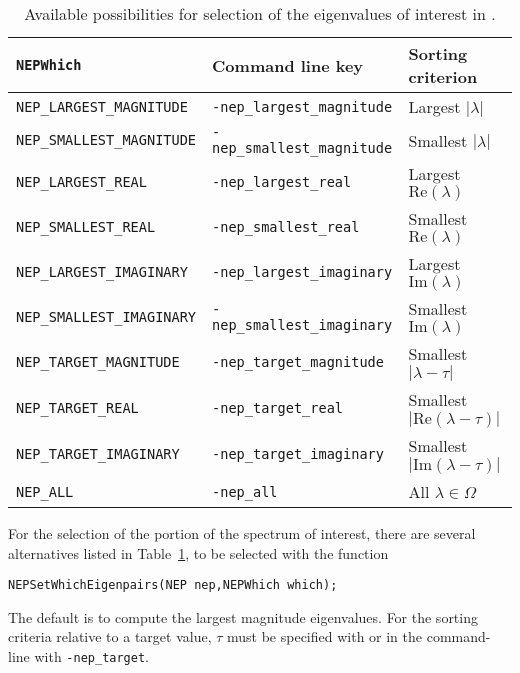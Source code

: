\begin{table}
\centering
{\small \begin{tabular}{lll}
\texttt{NEPWhich}                  & Command line key                   & Sorting criterion \\\hline
\texttt{NEP\_LARGEST\_MAGNITUDE}   & \texttt{-nep\_largest\_magnitude}  & Largest $|\lambda|$ \\
\texttt{NEP\_SMALLEST\_MAGNITUDE}  & \texttt{-nep\_smallest\_magnitude} & Smallest $|\lambda|$ \\
\texttt{NEP\_LARGEST\_REAL}        & \texttt{-nep\_largest\_real}       & Largest $\mathrm{Re}(\lambda)$ \\
\texttt{NEP\_SMALLEST\_REAL}       & \texttt{-nep\_smallest\_real}      & Smallest $\mathrm{Re}(\lambda)$ \\
\texttt{NEP\_LARGEST\_IMAGINARY}   & \texttt{-nep\_largest\_imaginary}  & Largest $\mathrm{Im}(\lambda)$ \\
\texttt{NEP\_SMALLEST\_IMAGINARY}  & \texttt{-nep\_smallest\_imaginary} & Smallest $\mathrm{Im}(\lambda)$ \\\hline
\texttt{NEP\_TARGET\_MAGNITUDE}    & \texttt{-nep\_target\_magnitude}   & Smallest $|\lambda-\tau|$ \\
\texttt{NEP\_TARGET\_REAL}         & \texttt{-nep\_target\_real}        & Smallest $|\mathrm{Re}(\lambda-\tau)|$ \\
\texttt{NEP\_TARGET\_IMAGINARY}    & \texttt{-nep\_target\_imaginary}   & Smallest $|\mathrm{Im}(\lambda-\tau)|$ \\\hline
\texttt{NEP\_ALL}                  & \texttt{-nep\_all}                 & All $\lambda\in\Omega$\\\hline
\end{tabular} }
\caption{\label{tab:portionn}Available possibilities for selection of the eigenvalues of interest in .}
\end{table}

	For the selection of the portion of the spectrum of interest, there are several alternatives listed in Table~\ref{tab:portionn}, to be selected with the function
	\begin{Verbatim}[fontsize=\small]
	NEPSetWhichEigenpairs(NEP nep,NEPWhich which);
	\end{Verbatim}
The default is to compute the largest magnitude eigenvalues.
For the sorting criteria relative to a target value, $\tau$ must be specified with  or in the command-line with \Verb!-nep_target!.


